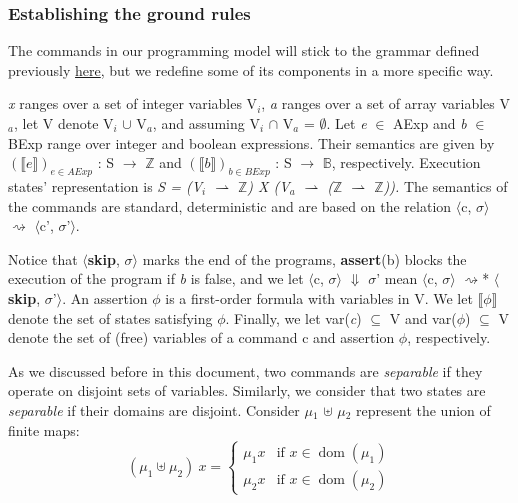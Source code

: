 \FloatBarrier
\subsubsection{Establishing the ground rules} 
\label{subsubsec:product_programs_ground_rules}

The commands in our programming model will stick to the grammar defined previously \hyperref[sub:relational_hoare_logic_formal_proof_rules]{here}, but we redefine some of its components in a more specific way.

\emph{x} ranges over a set of integer variables V$_i$, \emph{a} ranges over a set of array variables V$_a$, let V denote V$_i$ $\cup$ V$_a$, and assuming V$_i$ $\cap$ V$_a$ = $\emptyset$.
Let \emph{e} $\in$ AExp and \emph{b} $\in$ BExp range over integer and boolean expressions.
Their semantics are given by ${(\llbracket e \rrbracket)}_{e \in AExp}$ : S $\rightarrow$ $\mathbb{Z}$ and ${(\llbracket b \rrbracket)}_{b \in BExp}$ : S $\rightarrow$ $\mathbb{B}$, respectively.
Execution states' representation is \emph{S = (V$_i$ $\rightharpoonup$ $\mathbb{Z}$) X (V$_a$ $\rightharpoonup$ ($\mathbb{Z}$ $\rightharpoonup$ $\mathbb{Z}$)).}
The semantics of the commands are standard, deterministic and are based on the relation $\langle$c, $\sigma$$\rangle$ $\rightsquigarrow$ $\langle$c', $\sigma$'$\rangle$.

Notice that $\langle$\textbf{skip}, $\sigma$$\rangle$ marks the end of the programs, \textbf{assert}(b) blocks the execution of the program if \emph{b} is false, and we let $\langle$c, $\sigma$$\rangle$ $\Downarrow$ $\sigma$' mean $\langle$c, $\sigma$$\rangle$ $\rightsquigarrow$* $\langle$\textbf{skip}, $\sigma$'$\rangle$.
An assertion $\phi$ is a first-order formula with variables in V.
We let $\llbracket\phi\rrbracket$ denote the set of states satisfying $\phi$.
Finally, we let var(\emph{c}) $\subseteq$ V and var($\phi$) $\subseteq$ V denote the set of (free) variables of a command c and assertion $\phi$, respectively.

As we discussed before in this document, two commands are \emph{separable} if they operate on disjoint sets of variables.
Similarly, we consider that two states are \emph{separable} if their domains are disjoint.
Consider $\mu$$_1$ $\uplus$ $\mu$$_2$ represent the union of finite maps:
\[
(\mu_1 \uplus \mu_2) \ x =
\begin{cases}
    \mu_1 x & \text{if } x \in \operatorname{dom}(\mu_1) \\
    \mu_2 x & \text{if } x \in \operatorname{dom}(\mu_2)
\end{cases}
\]

